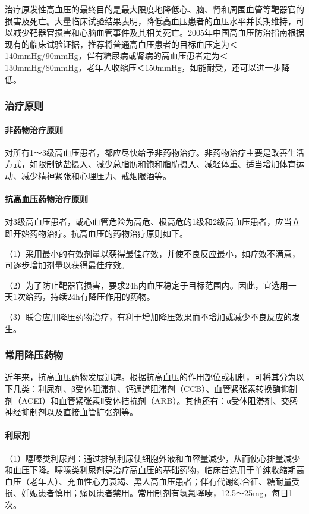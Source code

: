 治疗原发性高血压的最终目的是最大限度地降低心、脑、肾和周围血管等靶器官的损害及死亡。大量临床试验结果表明，降低高血压患者的血压水平并长期维持，可以减少靶器官损害和心脑血管事件及其相关死亡。2005年中国高血压防治指南根据现有的临床试验证据，推荐将普通高血压患者的目标血压定为＜140mmHg/90mmHg，伴有糖尿病或肾病的高血压患者定为＜130mmHg/80mmHg，老年人收缩压＜150mmHg，如能耐受，还可以进一步降低。

\subsubsection{治疗原则}
\paragraph{非药物治疗原则}

对所有1～3级高血压患者，都应尽快给予非药物治疗。非药物治疗主要是改善生活方式，如限制钠盐摄入、减少总脂肪和饱和脂肪摄入、减轻体重、适当增加体育运动、减少精神紧张和心理压力、戒烟限酒等。
\paragraph{抗高血压药物治疗原则}

对3级高血压患者，或心血管危险为高危、极高危的1级和2级高血压患者，应当立即开始药物治疗。抗高血压的药物治疗原则如下。

（1）采用最小的有效剂量以获得最佳疗效，并使不良反应最小，如疗效不满意，可逐步增加剂量以获得最佳疗效。

（2）为了防止靶器官损害，要求24h内血压稳定于目标范围内。因此，宜选用一天1次给药，持续24h有降压作用的药物。

（3）联合应用降压药物治疗，有利于增加降压效果而不增加或减少不良反应的发生。

\subsubsection{常用降压药物}

近年来，抗高血压药物发展迅速。根据抗高血压的作用部位或机制，可将其分为以下几类：利尿剂、β受体阻滞剂、钙通道阻滞剂（CCB）、血管紧张素转换酶抑制剂（ACEI）和血管紧张素Ⅱ受体拮抗剂（ARB）。其他还有：α受体阻滞剂、交感神经抑制剂以及直接血管扩张剂等。
\paragraph{利尿剂}

（1）噻嗪类利尿剂：通过排钠利尿使细胞外液和血容量减少，从而使心排量减少和血压下降。噻嗪类利尿剂是治疗高血压的基础药物，临床首选用于单纯收缩期高血压（老年人）、充血性心力衰竭、黑人高血压患者；伴有代谢综合征、糖耐量受损、妊娠患者慎用；痛风患者禁用。常用制剂有氢氯噻嗪，12.5～25mg，每日1次。

